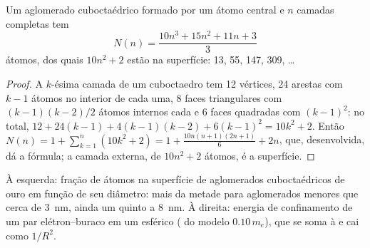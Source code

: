 \begin{proposition}\label{prop:b3:inorganic-materials:magic}
Um aglomerado cuboctaédrico formado por um átomo central e $n$ camadas completas tem
\[
  N(n) = \frac{10n^3 + 15n^2 + 11n + 3}{3}
\]
átomos, dos quais $10n^2 + 2$ estão na superfície: 13, 55, 147, 309, \dots
\end{proposition}

\begin{proof}
A $k$-ésima camada de um cuboctaedro tem 12 vértices, 24 arestas com $k - 1$ átomos
no interior de cada uma, 8 faces triangulares com $(k - 1)(k - 2)/2$ átomos internos cada e 6
faces quadradas com $(k - 1)^2$: no total, $12 + 24(k - 1) + 4(k - 1)(k - 2) + 6(k - 1)^2 = 10k^2 + 2$. Então
$N(n) = 1 + \sum_{k=1}^{n}(10k^2 + 2) = 1 + \frac{10n(n + 1)(2n + 1)}{6} + 2n$, que, desenvolvida, dá a fórmula; a
camada externa, de $10n^2 + 2$ átomos, é a superfície.
\end{proof}

\begin{omfigure}

{\small À esquerda: fração de átomos na superfície de aglomerados cuboctaédricos de ouro
em função de seu diâmetro: mais da metade para aglomerados menores que cerca de
\qty{3}{nm}, ainda um quinto a \qty{8}{nm}. À direita: energia de confinamento de um
par elétron--buraco em um  esférico ( do modelo $0.10\,m_e$),
que se soma à  e cai como $1/R^2$.}
\end{omfigure}

